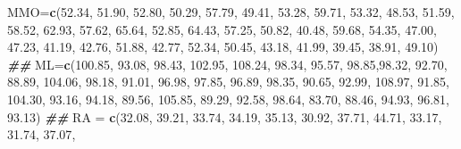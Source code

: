\documentclass[
]{book}
\newenvironment{Shaded}{\begin{snugshade}}{\end{snugshade}}
\newcommand{\DocumentationTok}[1]{\textcolor[rgb]{0.56,0.35,0.01}{\textbf{\textit{#1}}}}
\newcommand{\FloatTok}[1]{\textcolor[rgb]{0.00,0.00,0.81}{#1}}
\newcommand{\FunctionTok}[1]{\textcolor[rgb]{0.13,0.29,0.53}{\textbf{#1}}}
\newcommand{\NormalTok}[1]{#1}
\newcommand{\OtherTok}[1]{\textcolor[rgb]{0.56,0.35,0.01}{#1}}
\begin{document}
\begin{Shaded}
\begin{Highlighting}[]
\NormalTok{MMO}\OtherTok{=}\FunctionTok{c}\NormalTok{(}\FloatTok{52.34}\NormalTok{, }\FloatTok{51.90}\NormalTok{, }\FloatTok{52.80}\NormalTok{, }\FloatTok{50.29}\NormalTok{, }\FloatTok{57.79}\NormalTok{, }\FloatTok{49.41}\NormalTok{, }\FloatTok{53.28}\NormalTok{, }\FloatTok{59.71}\NormalTok{, }\FloatTok{53.32}\NormalTok{, }\FloatTok{48.53}\NormalTok{, }\FloatTok{51.59}\NormalTok{, }
      \FloatTok{58.52}\NormalTok{, }\FloatTok{62.93}\NormalTok{, }\FloatTok{57.62}\NormalTok{, }\FloatTok{65.64}\NormalTok{, }\FloatTok{52.85}\NormalTok{, }\FloatTok{64.43}\NormalTok{, }\FloatTok{57.25}\NormalTok{, }\FloatTok{50.82}\NormalTok{, }\FloatTok{40.48}\NormalTok{, }\FloatTok{59.68}\NormalTok{, }\FloatTok{54.35}\NormalTok{, }
      \FloatTok{47.00}\NormalTok{, }\FloatTok{47.23}\NormalTok{,  }\FloatTok{41.19}\NormalTok{, }\FloatTok{42.76}\NormalTok{, }\FloatTok{51.88}\NormalTok{, }\FloatTok{42.77}\NormalTok{, }\FloatTok{52.34}\NormalTok{, }\FloatTok{50.45}\NormalTok{, }\FloatTok{43.18}\NormalTok{, }\FloatTok{41.99}\NormalTok{, }\FloatTok{39.45}\NormalTok{, }
      \FloatTok{38.91}\NormalTok{, }\FloatTok{49.10}\NormalTok{)}
\DocumentationTok{\#\#}
\NormalTok{ML}\OtherTok{=}\FunctionTok{c}\NormalTok{(}\FloatTok{100.85}\NormalTok{, }\FloatTok{93.08}\NormalTok{, }\FloatTok{98.43}\NormalTok{, }\FloatTok{102.95}\NormalTok{, }\FloatTok{108.24}\NormalTok{, }\FloatTok{98.34}\NormalTok{, }\FloatTok{95.57}\NormalTok{, }\FloatTok{98.85}\NormalTok{,}\FloatTok{98.32}\NormalTok{, }\FloatTok{92.70}\NormalTok{, }\FloatTok{88.89}\NormalTok{, }
     \FloatTok{104.06}\NormalTok{,  }\FloatTok{98.18}\NormalTok{, }\FloatTok{91.01}\NormalTok{, }\FloatTok{96.98}\NormalTok{, }\FloatTok{97.85}\NormalTok{, }\FloatTok{96.89}\NormalTok{, }\FloatTok{98.35}\NormalTok{, }\FloatTok{90.65}\NormalTok{, }\FloatTok{92.99}\NormalTok{, }\FloatTok{108.97}\NormalTok{, }\FloatTok{91.85}\NormalTok{, }
     \FloatTok{104.30}\NormalTok{, }\FloatTok{93.16}\NormalTok{, }\FloatTok{94.18}\NormalTok{, }\FloatTok{89.56}\NormalTok{, }\FloatTok{105.85}\NormalTok{, }\FloatTok{89.29}\NormalTok{, }\FloatTok{92.58}\NormalTok{, }\FloatTok{98.64}\NormalTok{, }\FloatTok{83.70}\NormalTok{, }\FloatTok{88.46}\NormalTok{, }\FloatTok{94.93}\NormalTok{, }
     \FloatTok{96.81}\NormalTok{, }\FloatTok{93.13}\NormalTok{)}
\DocumentationTok{\#\#}
\NormalTok{RA }\OtherTok{=} \FunctionTok{c}\NormalTok{(}\FloatTok{32.08}\NormalTok{, }\FloatTok{39.21}\NormalTok{, }\FloatTok{33.74}\NormalTok{, }\FloatTok{34.19}\NormalTok{, }\FloatTok{35.13}\NormalTok{, }\FloatTok{30.92}\NormalTok{, }\FloatTok{37.71}\NormalTok{, }\FloatTok{44.71}\NormalTok{, }\FloatTok{33.17}\NormalTok{, }\FloatTok{31.74}\NormalTok{, }\FloatTok{37.07}\NormalTok{, }

\end{Highlighting}
\end{Shaded}
\end{document}
